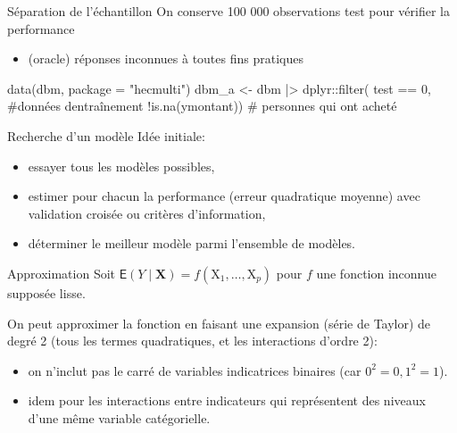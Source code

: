 \documentclass[
  ignorenonframetext,
]{beamer}
\newenvironment{Shaded}{\begin{snugshade}}{\end{snugshade}}
\newcommand{\AttributeTok}[1]{\textcolor[rgb]{0.40,0.45,0.13}{#1}}
\newcommand{\CommentTok}[1]{\textcolor[rgb]{0.37,0.37,0.37}{#1}}
\newcommand{\DecValTok}[1]{\textcolor[rgb]{0.68,0.00,0.00}{#1}}
\newcommand{\FunctionTok}[1]{\textcolor[rgb]{0.28,0.35,0.67}{#1}}
\newcommand{\NormalTok}[1]{\textcolor[rgb]{0.00,0.23,0.31}{#1}}
\newcommand{\OtherTok}[1]{\textcolor[rgb]{0.00,0.23,0.31}{#1}}
\newcommand{\SpecialCharTok}[1]{\textcolor[rgb]{0.37,0.37,0.37}{#1}}
\newcommand{\StringTok}[1]{\textcolor[rgb]{0.13,0.47,0.30}{#1}}
\providecommand{\tightlist}{%
  \setlength{\itemsep}{0pt}\setlength{\parskip}{0pt}}\usepackage{longtable,booktabs,array}
\begin{document}
\begin{frame}[fragile]{Séparation de l'échantillon}
\protect\hypertarget{suxe9paration-de-luxe9chantillon}{}
On conserve 100 000 observations test pour vérifier la performance

\begin{itemize}
\tightlist
\item
  (oracle) réponses inconnues à toutes fins pratiques
\end{itemize}

\footnotesize

\begin{Shaded}
\begin{Highlighting}[numbers=left,,]
\FunctionTok{data}\NormalTok{(dbm, }\AttributeTok{package =} \StringTok{"hecmulti"}\NormalTok{)}
\NormalTok{dbm\_a }\OtherTok{\textless{}{-}}\NormalTok{ dbm }\SpecialCharTok{|\textgreater{}}
\NormalTok{  dplyr}\SpecialCharTok{::}\FunctionTok{filter}\NormalTok{(}
\NormalTok{    test }\SpecialCharTok{==} \DecValTok{0}\NormalTok{, }\CommentTok{\#données d\textquotesingle{}entraînement}
    \SpecialCharTok{!}\FunctionTok{is.na}\NormalTok{(ymontant)) }\CommentTok{\# personnes qui ont acheté}
\end{Highlighting}
\end{Shaded}

\normalsize
\end{frame}

\begin{frame}{Recherche d'un modèle}
\protect\hypertarget{recherche-dun-moduxe8le}{}
Idée initiale:

\begin{itemize}
\tightlist
\item
  essayer tous les modèles possibles,
\item
  estimer pour chacun la performance (erreur quadratique moyenne) avec
  validation croisée ou critères d'information,
\item
  déterminer le meilleur modèle parmi l'ensemble de modèles.
\end{itemize}
\end{frame}

\begin{frame}{Approximation}
\protect\hypertarget{approximation}{}
Soit
\(\mathsf{E}(Y \mid \mathbf{X}) = f(\mathrm{X}_1, \ldots, \mathrm{X}_p)\)
pour \(f\) une fonction inconnue supposée lisse.

On peut approximer la fonction en faisant une expansion (série de
Taylor) de degré 2 (tous les termes quadratiques, et les interactions
d'ordre 2):

\begin{itemize}
\tightlist
\item
  on n'inclut pas le carré de variables indicatrices binaires (car
  \(0^2=0, 1^2=1\)).
\item
  idem pour les interactions entre indicateurs qui représentent des
  niveaux d'une même variable catégorielle.
\end{itemize}
\end{frame}
\end{document}
